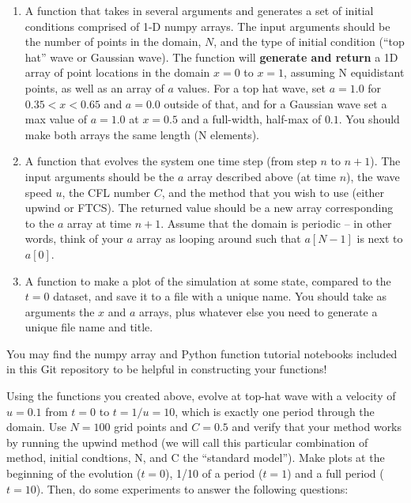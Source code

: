 \documentclass[10pt]{article}
\begin{document}
\begin{enumerate}

\item A function that takes in several arguments and generates a set
of initial conditions comprised of 1-D numpy arrays.  The input
arguments should be the number of points in the domain, $N$, and the
type of initial condition (``top hat'' wave or Gaussian wave).  The
function will \textbf{generate and return} a 1D array of point
locations in the domain $x=0$ to $x=1$, assuming N equidistant points,
as well as an array of $a$ values.  For a top hat wave, set $a=1.0$
for $0.35 < x < 0.65$ and $a=0.0$ outside of that, and for a Gaussian
wave set a max value of $a=1.0$ at $x=0.5$ and a full-width, half-max
of $0.1$.  You should make both arrays the same length (N
elements).

\item A function that evolves the system one time step (from step $n$
to $n+1$).  The input arguments should be the $a$ array described
above (at time $n$), the wave speed $u$, the CFL number $C$, and the
method that you wish to use (either upwind or FTCS).  The returned
value should be a new array corresponding to the $a$ array at time
$n+1$.  Assume that the domain is periodic -- in other words, think of
your $a$ array as looping around such that $a[N-1]$ is next to $a[0]$.

\item A function to make a plot of the simulation at some state,
  compared to the $t=0$ dataset, and save it to a
file with a unique name.  You should take as arguments the $x$ and $a$
arrays, plus whatever else you need to generate a unique file name and
title.
   
\end{enumerate}

\noindent
You may find the numpy array and Python function tutorial notebooks 
included in this Git repository to be helpful in constructing your
functions!

\vspace{2mm}
Using the functions you created above, evolve at top-hat wave with a
velocity of $u=0.1$ from $t=0$ to $t=1/u= 10$, which is exactly one period
through the domain.  Use $N=100$ grid points and $C=0.5$ and verify
that your method works by running the upwind method (we will call this
particular combination of method, initial condtions, N, and C the
``standard model'').  Make plots at the beginning of the evolution
($t=0$), 1/10 of a period ($t=1$) and a full period ($t=10$).  Then,
do some experiments to answer the following questions:
\end{document}
